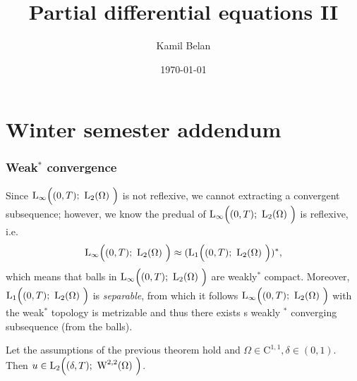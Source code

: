 \documentclass{article}
\title{Partial differential equations II}
\date{\today}
\author{Kamil Belan}
\begin{document}
\begin{comment}
 \begin{abstract}
  Here comes the abstract.
\end{abstract}

\end{comment}

\maketitle

\section{Winter semester addendum}
\label{chap:addendum}

\subsubsection{Weak$^*$ convergence}
\label{sec:weakstarconv}
Since $\LinfIntX{0}{T}{\LpSet[2]{\Omega}}$ is not reflexive, we cannot extracting a convergent subsequence; however, we know the predual of $\LinfIntX{0}{T}{\LpSet[2]{\Omega}}$ is reflexive, i.e.
\[
	\LinfIntX{0}{T}{\LpSet[2]{\Omega}} \approx (\LpIntX{1}{0}{T}{\LpSet[2]{\Omega}})^{*},
\]
which means that balls in $\LinfIntX{0}{T}{\LpSet[2]{\Omega}}$ are weakly$^{*}$ compact. Moreover, $\LpIntX{1}{0}{T}{\LpSet[2]{\Omega}}$ is \textit{separable}, from which it follows $\LinfIntX{0}{T}{\LpSet[2]{\Omega}}$ with the weak$^{*}$ topology is metrizable and thus there exists s weakly $^{*}$ converging subsequence (from the balls).

\begin{theorem}
	Let the assumptions of the previous theorem hold and $\Omega \in \text{C}^{1,1}, \delta \in (0,1).$ Then $ u \in \LpIntX{2}{\delta}{T}{\WkpSet[2][2]{\Omega}}$.
\end{theorem}
\end{document}
